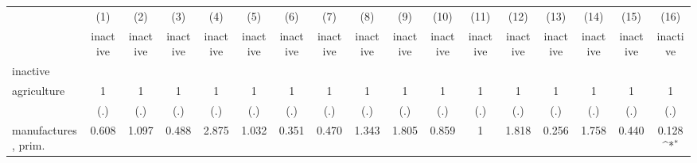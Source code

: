 {
\def\sym#1{\ifmmode^{#1}\else\(^{#1}\)\fi}
\begin{tabular}{l*{16}{c}}
\hline\hline
                    &\multicolumn{1}{c}{(1)}&\multicolumn{1}{c}{(2)}&\multicolumn{1}{c}{(3)}&\multicolumn{1}{c}{(4)}&\multicolumn{1}{c}{(5)}&\multicolumn{1}{c}{(6)}&\multicolumn{1}{c}{(7)}&\multicolumn{1}{c}{(8)}&\multicolumn{1}{c}{(9)}&\multicolumn{1}{c}{(10)}&\multicolumn{1}{c}{(11)}&\multicolumn{1}{c}{(12)}&\multicolumn{1}{c}{(13)}&\multicolumn{1}{c}{(14)}&\multicolumn{1}{c}{(15)}&\multicolumn{1}{c}{(16)}\\
                    &\multicolumn{1}{c}{inactive}&\multicolumn{1}{c}{inactive}&\multicolumn{1}{c}{inactive}&\multicolumn{1}{c}{inactive}&\multicolumn{1}{c}{inactive}&\multicolumn{1}{c}{inactive}&\multicolumn{1}{c}{inactive}&\multicolumn{1}{c}{inactive}&\multicolumn{1}{c}{inactive}&\multicolumn{1}{c}{inactive}&\multicolumn{1}{c}{inactive}&\multicolumn{1}{c}{inactive}&\multicolumn{1}{c}{inactive}&\multicolumn{1}{c}{inactive}&\multicolumn{1}{c}{inactive}&\multicolumn{1}{c}{inactive}\\
\hline
inactive            &                     &                     &                     &                     &                     &                     &                     &                     &                     &                     &                     &                     &                     &                     &                     &                     \\
agriculture         &           1         &           1         &           1         &           1         &           1         &           1         &           1         &           1         &           1         &           1         &           1         &           1         &           1         &           1         &           1         &           1         \\
                    &         (.)         &         (.)         &         (.)         &         (.)         &         (.)         &         (.)         &         (.)         &         (.)         &         (.)         &         (.)         &         (.)         &         (.)         &         (.)         &         (.)         &         (.)         &         (.)         \\
[1em]
manufactures, prim. &       0.608         &       1.097         &       0.488         &       2.875         &       1.032         &       0.351         &       0.470         &       1.343         &       1.805         &       0.859         &           1         &       1.818         &       0.256         &       1.758         &       0.440         &       0.128\sym{*}  \\

\end{tabular}}
